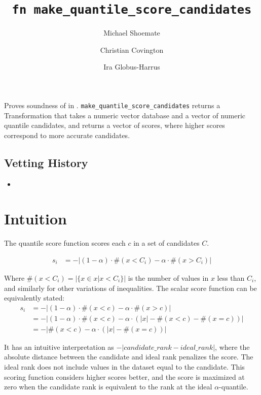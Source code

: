 \documentclass{article}
\title{\texttt{fn make\_quantile\_score\_candidates}}
\author{Michael Shoemate \and Christian Covington \and Ira Globus-Harrus}
\begin{document}
\maketitle  


\contrib

Proves soundness of  
in .
\texttt{make\_quantile\_score\_candidates} returns a Transformation that 
takes a numeric vector database and a vector of numeric quantile candidates,
and returns a vector of scores, where higher scores correspond to more accurate candidates.

\subsection*{Vetting History}
\begin{itemize}
    \item {}
\end{itemize}

\section{Intuition}
The quantile score function scores each $c$ in a set of candidates $C$.

\begin{equation}
\begin{array}{rl}
    s_i &= -|(1 - \alpha) \cdot \#(x < C_i) - \alpha \cdot \#(x > C_i)|
\end{array}
\end{equation}

Where $\#(x < C_i) = |\{x \in x | x < C_i\}|$ is the number of values in $x$ less than $C_i$, 
and similarly for other variations of inequalities.
The scalar score function can be equivalently stated:
\begin{align}
    s_i &= -|(1 - \alpha) \cdot \#(x < c) - \alpha \cdot \#(x > c)| \\
    &= -|(1 - \alpha) \cdot \#(x < c) - \alpha \cdot (|x| - \#(x < c) - \#(x = c))| \\
    &= -|\#(x < c) - \alpha \cdot (|x| - \#(x = c))|
\end{align}

It has an intuitive interpretation as $-|candidate\_rank - ideal\_rank|$, 
where the absolute distance between the candidate and ideal rank penalizes the score.
The ideal rank does not include values in the dataset equal to the candidate.
This scoring function considers higher scores better, 
and the score is maximized at zero when the candidate rank is equivalent to the rank at the ideal $\alpha$-quantile.
\end{document}
